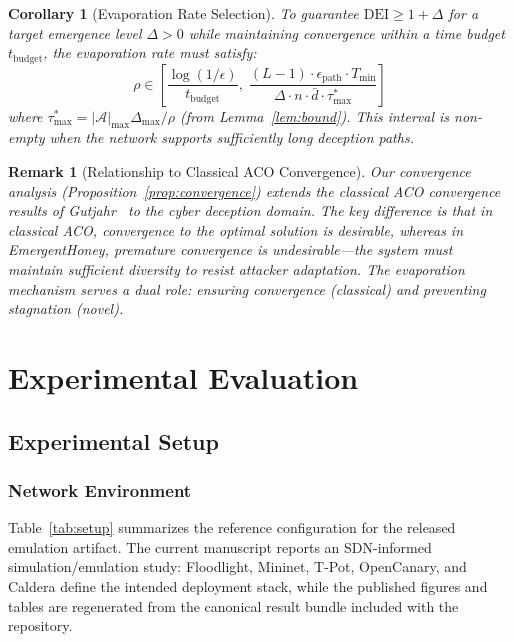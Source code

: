 \documentclass[review,3p,twocolumn]{elsarticle}
\newtheorem{corollary}[theorem]{Corollary}
\newtheorem{remark}{Remark}
\newcommand{\calA}{\mathcal{A}}
\newcommand{\DEI}{\mathrm{DEI}}
\begin{document}
\begin{corollary}[Evaporation Rate Selection]
\label{cor:rho}
To guarantee $\DEI \geq 1 + \Delta$ for a target emergence level $\Delta > 0$ while maintaining convergence within a time budget $t_{\mathrm{budget}}$, the evaporation rate must satisfy:
\begin{equation}
\rho \in \left[\frac{\log(1/\epsilon)}{t_{\mathrm{budget}}}, \; \frac{(L-1) \cdot \epsilon_{\mathrm{path}} \cdot T_{\min}}{\Delta \cdot n \cdot \bar{d} \cdot \tau_{\max}^*}\right]
\end{equation}
where $\tau_{\max}^* = |\calA|_{\max} \Delta_{\max} / \rho$ (from Lemma~\ref{lem:bound}). This interval is non-empty when the network supports sufficiently long deception paths.
\end{corollary}

\begin{remark}[Relationship to Classical ACO Convergence]
Our convergence analysis (Proposition~\ref{prop:convergence}) extends the classical ACO convergence results of Gutjahr~\cite{gutjahr2006aco} to the cyber deception domain. The key difference is that in classical ACO, convergence to the optimal solution is desirable, whereas in EmergentHoney, premature convergence is undesirable---the system must maintain sufficient diversity to resist attacker adaptation. The evaporation mechanism serves a dual role: ensuring convergence (classical) and preventing stagnation (novel).
\end{remark}


\section{Experimental Evaluation}
\label{sec:experiments}

\subsection{Experimental Setup}

\subsubsection{Network Environment}

Table~\ref{tab:setup} summarizes the reference configuration for the released emulation artifact. The current manuscript reports an SDN-informed simulation/emulation study: Floodlight, Mininet, T-Pot, OpenCanary, and Caldera define the intended deployment stack, while the published figures and tables are regenerated from the canonical result bundle included with the repository.
\end{document}
